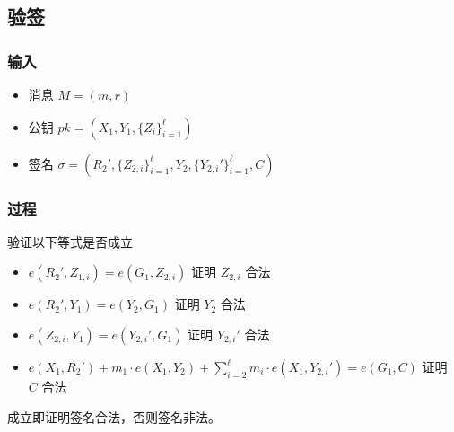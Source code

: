 \documentclass[a4paper,10pt]{article}
\begin{document}
\subsection{验签}
\subsubsection{输入}
\begin{itemize}
  \item 消息 \(M=(m,r)\)
  \item 公钥 \(pk=(X_1,Y_1,\{Z_i\}_{i=1}^{\ell})\)
  \item 签名 \(\sigma=(R_2',\{Z_{2,i}\}_{i=1}^{\ell},Y_2,\{Y_{2,i}'\}_{i=1}^{\ell},C)\)
\end{itemize}

\subsubsection{过程}
验证以下等式是否成立
\begin{itemize}
  \item \(e(R_2',Z_{1,i})=e(G_1,Z_{2,i})\) 证明 \(Z_{2,i}\) 合法
  \item \(e(R_2',Y_1)=e(Y_2,G_1)\) 证明 \(Y_2\) 合法
  \item \(e(Z_{2,i},Y_1)=e(Y_{2,i}',G_1)\) 证明 \(Y_{2,i}'\) 合法
  \item \(e(X_1,R_2')+m_1\cdot e(X_1,Y_2)+\sum_{i=2}^{\ell} m_i\cdot e(X_1,Y_{2,i}')=e(G_1,C)\) 证明 \(C\) 合法
\end{itemize}

成立即证明签名合法，否则签名非法。
\end{document}
